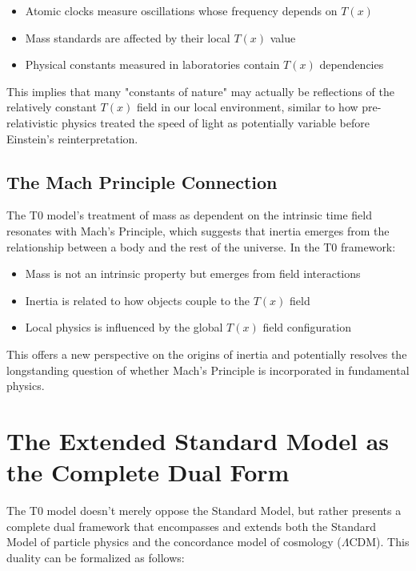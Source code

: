 \documentclass[12pt,a4paper]{article}
\newcommand{\Tfield}{T(x)}
\begin{document}
	\begin{itemize}
		\item Atomic clocks measure oscillations whose frequency depends on $\Tfield$
		\item Mass standards are affected by their local $\Tfield$ value
		\item Physical constants measured in laboratories contain $\Tfield$ dependencies
	\end{itemize}
	
	This implies that many "constants of nature" may actually be reflections of the relatively constant $\Tfield$ field in our local environment, similar to how pre-relativistic physics treated the speed of light as potentially variable before Einstein's reinterpretation.
	
	\subsection{The Mach Principle Connection}
	
	The T0 model's treatment of mass as dependent on the intrinsic time field resonates with Mach's Principle, which suggests that inertia emerges from the relationship between a body and the rest of the universe. In the T0 framework:
	
	\begin{itemize}
		\item Mass is not an intrinsic property but emerges from field interactions
		\item Inertia is related to how objects couple to the $\Tfield$ field
		\item Local physics is influenced by the global $\Tfield$ field configuration
	\end{itemize}
	
	This offers a new perspective on the origins of inertia and potentially resolves the longstanding question of whether Mach's Principle is incorporated in fundamental physics.
	
	\section{The Extended Standard Model as the Complete Dual Form}
	
	The T0 model doesn't merely oppose the Standard Model, but rather presents a complete dual framework that encompasses and extends both the Standard Model of particle physics and the concordance model of cosmology ($\Lambda$CDM). This duality can be formalized as follows:
	
\end{document}
